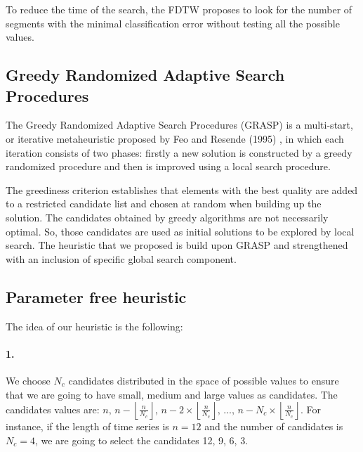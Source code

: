 To reduce the time of the search, the FDTW proposes to look for the
number of segments with the minimal classification error without testing all the possible values.

\subsection{ Greedy Randomized Adaptive Search Procedures}
The Greedy Randomized Adaptive Search Procedures (GRASP) is a multi-start, or iterative metaheuristic proposed by Feo and Resende
(1995) \cite{feo1995greedy}, in which each iteration consists of two phases:
firstly a new solution is constructed by a greedy randomized
procedure and  then is improved using a local search procedure.


The greediness criterion establishes that elements with the best quality are
 added to a restricted candidate list and chosen at random when
building up the solution. The candidates obtained by greedy algorithms are not
necessarily optimal. So, those candidates are  used as initial solutions
to be explored by local search. The heuristic that we proposed is build upon
GRASP and strengthened with an inclusion of specific global search component.


\subsection{Parameter free heuristic}

The idea of our heuristic is the following:

\paragraph{1.} We choose $N_{c}$ candidates distributed in the space of possible values
to ensure that we are going to have small, medium and large values as
candidates. The candidates values are: $n,\,n-\left\lfloor
\frac{n}{N_{c}}\right\rfloor ,\,n-2\times\left\lfloor \frac{n}{N_{c}}\right\rfloor
,\,...,\,n-N_{c}\times\left\lfloor \frac{n}{N_{c}}\right\rfloor $. For instance, if the length of
time series is $n = 12$ and the number of candidates is $N_c = 4$, we are going to select the
candidates 12, 9, 6, 3.
\begin{center}

\end{center}


